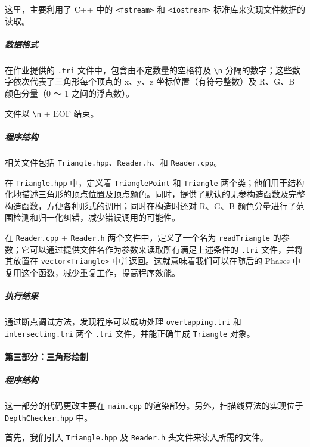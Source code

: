 \documentclass[
]{article}
\begin{document}
这里，主要利用了 C++ 中的 \texttt{\textless{}fstream\textgreater{}} 和
\texttt{\textless{}iostream\textgreater{}} 标准库来实现文件数据的读取。

\hypertarget{header-n25}{%
\subparagraph{数据格式}\label{header-n25}}

在作业提供的 \texttt{.tri} 文件中，包含由不定数量的空格符及
\texttt{\textquotesingle{}\textbackslash{}n\textquotesingle{}}
分隔的数字；这些数字依次代表了三角形每个顶点的 x、y、z
坐标位置（有符号整数）及 R、G、B 颜色分量（0 ～ 1 之间的浮点数）。

文件以 \texttt{\textquotesingle{}\textbackslash{}n\textquotesingle{}} +
EOF 结束。

\hypertarget{header-n28}{%
\subparagraph{程序结构}\label{header-n28}}

相关文件包括 \texttt{Triangle.hpp}、\texttt{Reader.h}、和
\texttt{Reader.cpp}。

在 \texttt{Triangle.hpp} 中，定义着 \texttt{TrianglePoint} 和
\texttt{Triangle}
两个类；他们用于结构化地描述三角形的顶点位置及顶点颜色。同时，提供了默认的无参构造函数及完整构造函数，方便各种形式的调用；同时在构造时还对
R、G、B 颜色分量进行了范围检测和归一化纠错，减少错误调用的可能性。

在 \texttt{Reader.cpp} + \texttt{Reader.h} 两个文件中，定义了一个名为
\texttt{readTriangle}
的参数；它可以通过提供文件名作为参数来读取所有满足上述条件的
\texttt{.tri} 文件，并将其放置在
\texttt{vector\textless{}Triangle\textgreater{}}
中并返回。这就意味着我们可以在随后的 Phases
中复用这个函数，减少重复工作，提高程序效能。

\hypertarget{header-n32}{%
\subparagraph{执行结果}\label{header-n32}}

通过断点调试方法，发现程序可以成功处理 \texttt{overlapping.tri} 和
\texttt{intersecting.tri} 两个 \texttt{.tri} 文件，并能正确生成
\texttt{Triangle} 对象。

\hypertarget{header-n34}{%
\paragraph{第三部分：三角形绘制}\label{header-n34}}

\hypertarget{header-n35}{%
\subparagraph{程序结构}\label{header-n35}}

这一部分的代码更改主要在 \texttt{main.cpp}
的渲染部分。另外，扫描线算法的实现位于 \texttt{DepthChecker.hpp} 中。

首先，我们引入 \texttt{Triangle.hpp} 及 \texttt{Reader.h}
头文件来读入所需的文件。
\end{document}
